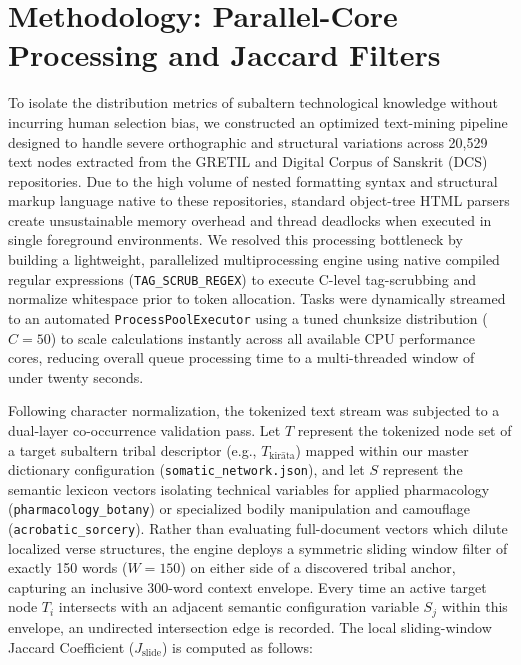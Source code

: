 \documentclass[11pt,twoside,letterpaper]{article}
\begin{document}


\section{Methodology: Parallel-Core Processing and Jaccard Filters}
\label{sec:methodology_processing_jaccard_filters}


To isolate the distribution metrics of subaltern technological knowledge without incurring human selection bias, we constructed an optimized text-mining pipeline designed to handle severe orthographic and structural variations across 20,529 text nodes extracted from the GRETIL and Digital Corpus of Sanskrit (DCS) repositories. Due to the high volume of nested formatting syntax and structural markup language native to these repositories, standard object-tree HTML parsers create unsustainable memory overhead and thread deadlocks when executed in single foreground environments. We resolved this processing bottleneck by building a lightweight, parallelized multiprocessing engine using native compiled regular expressions (\texttt{TAG\_SCRUB\_REGEX}) to execute C-level tag-scrubbing and normalize whitespace prior to token allocation. Tasks were dynamically streamed to an automated \texttt{ProcessPoolExecutor} using a tuned chunksize distribution ($C = 50$) to scale calculations instantly across all available CPU performance cores, reducing overall queue processing time to a multi-threaded window of under twenty seconds.

Following character normalization, the tokenized text stream was subjected to a dual-layer co-occurrence validation pass. Let $T$ represent the tokenized node set of a target subaltern tribal descriptor (e.g., $T_{\text{kirāta}}$) mapped within our master dictionary configuration (\texttt{somatic\_network.json}), and let $S$ represent the semantic lexicon vectors isolating technical variables for applied pharmacology (\texttt{phar\-ma\-col\-o\-gy\-\_bo\-ta\-ny}) or specialized bodily manipulation and camouflage (\texttt{ac\-ro\-ba\-tic\-\_sor\-ce\-ry}). Rather than evaluating full-document vectors which dilute localized verse structures, the engine deploys a symmetric sliding window filter of exactly 150 words ($W = 150$) on either side of a discovered tribal anchor, capturing an inclusive 300-word context envelope. Every time an active target node $T_i$ intersects with an adjacent semantic configuration variable $S_j$ within this envelope, an undirected intersection edge is recorded. The local sliding-window Jaccard Coefficient ($J_{\text{slide}}$) is computed as follows:
\end{document}
